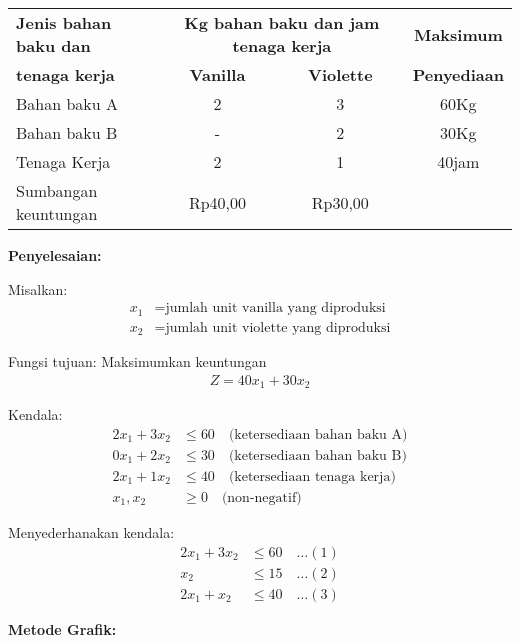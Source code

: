 \documentclass[12pt,a4paper]{article}
\begin{document}
\begin{enumerate}
    \begin{table}[H]
    \centering
    \begin{tabular}{|l|c|c|c|}
    \hline
    \textbf{Jenis bahan baku dan} & \multicolumn{2}{c|}{\textbf{Kg bahan baku dan jam tenaga kerja}} & \textbf{Maksimum} \\
    \textbf{tenaga kerja} & \textbf{Vanilla} & \textbf{Violette} & \textbf{Penyediaan} \\
    \hline
    Bahan baku A & 2 & 3 & 60Kg \\
    \hline
    Bahan baku B & - & 2 & 30Kg \\
    \hline
    Tenaga Kerja & 2 & 1 & 40jam \\
    \hline
    Sumbangan keuntungan & Rp40,00 & Rp30,00 & \\
    \hline
    \end{tabular}
    \end{table}
    
    \textbf{Penyelesaian:}
    
    Misalkan:
    \begin{align*}
    x_1 &= \text{jumlah unit vanilla yang diproduksi}\\  
    x_2 &= \text{jumlah unit violette yang diproduksi}
    \end{align*}
    
    Fungsi tujuan: Maksimumkan keuntungan
    \begin{align*}
    Z = 40x_1 + 30x_2
    \end{align*}
    
    Kendala:
    \begin{align*}
    2x_1 + 3x_2 &\leq 60 \quad \text{(ketersediaan bahan baku A)}\\  
    0x_1 + 2x_2 &\leq 30 \quad \text{(ketersediaan bahan baku B)}\\  
    2x_1 + 1x_2 &\leq 40 \quad \text{(ketersediaan tenaga kerja)}\\  
    x_1, x_2 &\geq 0 \quad \text{(non-negatif)}
    \end{align*}
    
    Menyederhanakan kendala:
    \begin{align*}
    2x_1 + 3x_2 &\leq 60 \quad \ldots (1)\\  
    x_2 &\leq 15 \quad \ldots (2)\\  
    2x_1 + x_2 &\leq 40 \quad \ldots (3)
    \end{align*}
    
    \textbf{Metode Grafik:}
    

\end{enumerate}
\end{document}
